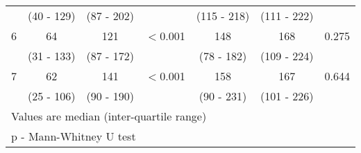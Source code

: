 \begin{table}[h]
\begin{tabular}{| c | c c c | c c c |}
		           & (40 - 129)  & (87 - 202)  &                  & (115 - 218) & (111 - 222) &  \\
		6          & 64          & 121         & $<$0.001         & 148         & 168         & 0.275            \\
		           & (31 - 133)  & (87 - 172)  &                  & (78 - 182)  & (109 - 224) &  \\
		7          & 62          & 141         & $<$0.001         & 158         & 167         & 0.644            \\
		           & (25 - 106)  & (90 - 190)  &                  & (90 - 231)  & (101 - 226) &  \\ \hline
		\multicolumn{7}{l}{Values are median (inter-quartile range)}                                             \\
		\multicolumn{7}{l}{p - Mann-Whitney U test}
	\end{tabular}
\end{table}